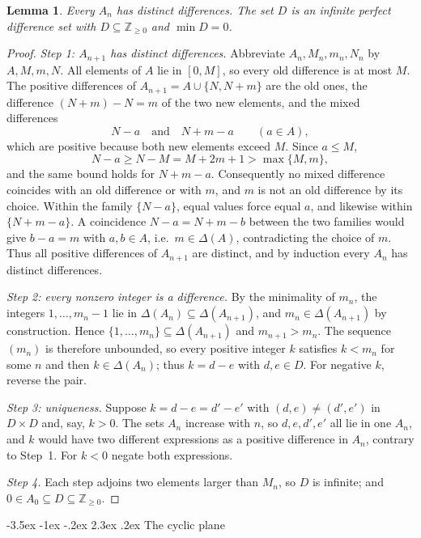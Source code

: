\documentclass[12pt]{article}
\makeatletter
\renewcommand\section{\@startsection{section}{1}{\z@}%
  {-3.5ex \@plus -1ex \@minus -.2ex}%
  {2.3ex \@plus.2ex}%
  {\normalfont\bfseries}}
\theoremstyle{plain}
\newtheorem{lemma}[theorem]{Lemma}
\theoremstyle{definition}
\newcommand{\Z}{\mathbb{Z}}
\makeatother
\begin{document}
\begin{lemma}\label{lem:diff}
Every $A_n$ has distinct differences.  The set $D$ is an infinite
perfect difference set with $D\subseteq\Z_{\geq0}$ and $\min D=0$.
\end{lemma}
\begin{proof}
\emph{Step 1: $A_{n+1}$ has distinct differences.}
Abbreviate $A_n,M_n,m_n,N_n$ by $A,M,m,N$.  All elements of $A$ lie in
$[0,M]$, so every old difference is at most $M$.  The positive
differences of $A_{n+1}=A\cup\{N,N+m\}$ are the old ones, the
difference $(N+m)-N=m$ of the two new elements, and the mixed
differences
\[
 N-a\quad\text{and}\quad N+m-a\qquad(a\in A),
\]
which are positive because both new elements exceed $M$.  Since
$a\leq M$,
\[
 N-a\geq N-M=M+2m+1>\max\{M,m\},
\]
and the same bound holds for $N+m-a$.  Consequently no mixed difference
coincides with an old difference or with $m$, and $m$ is not an old
difference by its choice.  Within the family $\{N-a\}$, equal values
force equal $a$, and likewise within $\{N+m-a\}$.  A coincidence
$N-a=N+m-b$ between the two families would give $b-a=m$ with
$a,b\in A$, i.e.\ $m\in\Delta(A)$, contradicting the choice of $m$.
Thus all positive differences of $A_{n+1}$ are distinct, and by
induction every $A_n$ has distinct differences.

\emph{Step 2: every nonzero integer is a difference.}
By the minimality of $m_n$, the integers $1,\dots,m_n-1$ lie in
$\Delta(A_n)\subseteq\Delta(A_{n+1})$, and $m_n\in\Delta(A_{n+1})$ by
construction.  Hence $\{1,\dots,m_n\}\subseteq\Delta(A_{n+1})$ and
$m_{n+1}>m_n$.  The sequence $(m_n)$ is therefore unbounded, so every
positive integer $k$ satisfies $k<m_n$ for some $n$ and then
$k\in\Delta(A_n)$; thus $k=d-e$ with $d,e\in D$.  For negative $k$,
reverse the pair.

\emph{Step 3: uniqueness.}
Suppose $k=d-e=d'-e'$ with $(d,e)\neq(d',e')$ in $D\times D$ and, say,
$k>0$.  The sets $A_n$ increase with $n$, so $d,e,d',e'$ all lie in one
$A_n$, and $k$ would have two different expressions as a positive
difference in $A_n$, contrary to Step~1.  For $k<0$ negate both
expressions.

\emph{Step 4.}  Each step adjoins two elements larger than $M_n$, so $D$
is infinite; and $0\in A_0\subseteq D\subseteq\Z_{\geq0}$.
\end{proof}

\section{The cyclic plane}\label{sec:plane}
\end{document}
